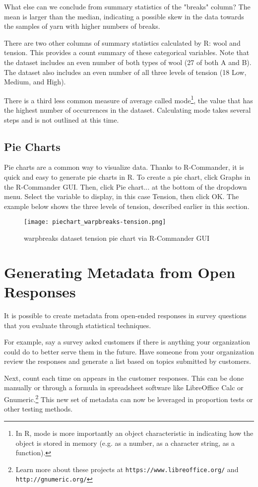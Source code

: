 What else can we conclude from summary statistics of the "breaks" column? The 
mean is larger than the median, indicating a possible skew in the data towards 
the samples of yarn with higher numbers of breaks.

There are two other columns of summary statistics calculated by R: wool and 
tension. This provides a count summary of these categorical variables. Note 
that the dataset includes an even number of both types of wool (27 of both A 
and B). The dataset also includes an even number of all three levels of tension
 (18 Low, Medium, and High).

There is a third less common measure of average called mode\footnote{In R, mode
 is more importantly an object characteristic in indicating how the object is 
 stored in memory (e.g. as a number, as a character string, as a function).}, 
 the value that has the highest number of occurrences in the dataset. 
 Calculating mode takes several steps and is not outlined at this time.


\subsection{Pie Charts}
Pie charts are a common way to visualize data. Thanks to R-Commander, it is 
quick and easy to generate pie charts in R. To create a pie chart, click Graphs
 in the R-Commander GUI. Then, click Pie chart... at the bottom of the dropdown
 menu. Select the variable to display, in this case Tension, then click OK. 
The example below shows the three levels of tension, described earlier in this 
section.

\begin{figure}[htbp]
\texttt{[image: piechart\_warpbreaks-tension.png]}
 \caption{warpbreaks dataset tension pie chart via R-Commander GUI}
 \label{fig:summary_warpbreaks}
\end{figure}

\section{Generating Metadata from Open Responses}
It is possible to create metadata from open-ended responses in survey questions
 that you evaluate through statistical techniques.

For example, say a survey asked customers if there is anything your 
organization could do to better serve them in the future. Have someone from 
your organization review the responses and generate a list based on topics 
submitted by customers. 

Next, count each time on appears in the customer responses. This can be done 
manually or through a formula in spreadsheet software like LibreOffice Calc or 
Gnumeric.\footnote{Learn more about these projects at 
\texttt{https://www.libreoffice.org/} and \texttt{http://gnumeric.org/}} This 
new set of metadata can now be leveraged in proportion tests or other testing 
methods.